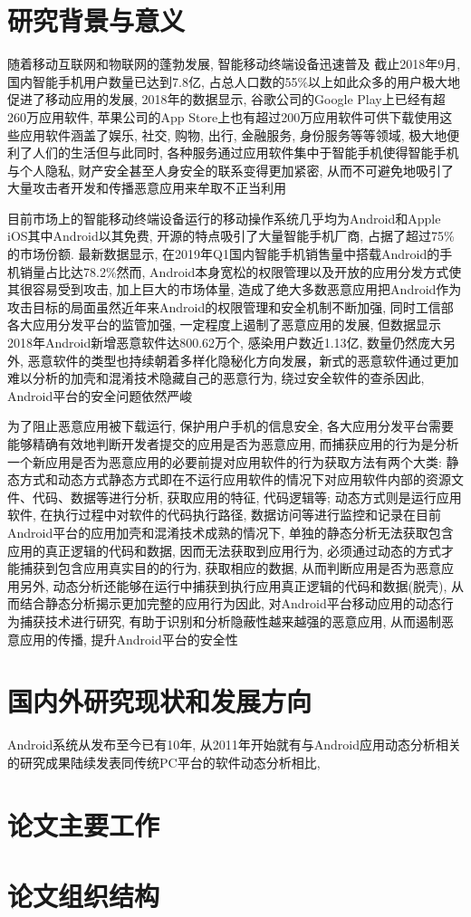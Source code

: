 \section{研究背景与意义}
随着移动互联网和物联网的蓬勃发展, 智能移动终端设备迅速普及\juhao 
截止2018年9月,国内智能手机用户数量已达到7.8亿, 占总人口数的55\%以上\juhao 如此众多的用户极大地促进了移动应用的发展, 2018年的数据显示, 谷歌公司的Google Play上已经有超260万应用软件, 苹果公司的App Store上也有超过200万应用软件可供下载使用\juhao 这些应用软件涵盖了娱乐, 社交, 购物, 出行, 金融服务, 身份服务等等领域, 极大地便利了人们的生活\juhao 但与此同时, 各种服务通过应用软件集中于智能手机使得智能手机与个人隐私, 财产安全甚至人身安全的联系变得更加紧密, 从而不可避免地吸引了大量攻击者开发和传播恶意应用来牟取不正当利用\juhao 

目前市场上的智能移动终端设备运行的移动操作系统几乎均为Android和Apple iOS\juhao 其中Android以其免费, 开源的特点吸引了大量智能手机厂商, 占据了超过75\%的市场份额. 最新数据显示, 在2019年Q1国内智能手机销售量中搭载Android的手机销量占比达78.2\%\juhao 然而, Android本身宽松的权限管理以及开放的应用分发方式使其很容易受到攻击, 加上巨大的市场体量, 造成了绝大多数恶意应用把Android作为攻击目标的局面\juhao 虽然近年来Android的权限管理和安全机制不断加强, 同时工信部各大应用分发平台的监管加强, 一定程度上遏制了恶意应用的发展, 但数据显示2018年Android新增恶意软件达800.62万个, 感染用户数近1.13亿, 数量仍然庞大\juhao 另外, 恶意软件的类型也持续朝着多样化隐秘化方向发展，新式的恶意软件通过更加难以分析的加壳和混淆技术隐藏自己的恶意行为, 绕过安全软件的查杀\juhao 因此, Android平台的安全问题依然严峻\juhao 

为了阻止恶意应用被下载运行, 保护用户手机的信息安全, 各大应用分发平台需要能够精确有效地判断开发者提交的应用是否为恶意应用, 而捕获应用的行为是分析一个新应用是否为恶意应用的必要前提\juhao 对应用软件的行为获取方法有两个大类: 静态方式和动态方式\juhao 静态方式即在不运行应用软件的情况下对应用软件内部的资源文件、代码、数据等进行分析, 获取应用的特征, 代码逻辑等; 动态方式则是运行应用软件, 在执行过程中对软件的代码执行路径, 数据访问等进行监控和记录\juhao 在目前Android平台的应用加壳和混淆技术成熟的情况下, 单独的静态分析无法获取包含应用的真正逻辑的代码和数据, 因而无法获取到应用行为, 必须通过动态的方式才能捕获到包含应用真实目的的行为, 获取相应的数据, 从而判断应用是否为恶意应用\juhao 另外, 动态分析还能够在运行中捕获到执行应用真正逻辑的代码和数据(脱壳), 从而结合静态分析揭示更加完整的应用行为\juhao 因此, 对Android平台移动应用的动态行为捕获技术进行研究, 有助于识别和分析隐蔽性越来越强的恶意应用, 从而遏制恶意应用的传播, 提升Android平台的安全性\juhao

\section{国内外研究现状和发展方向}
Android系统从发布至今已有10年, 从2011年开始就有与Android应用动态分析相关的研究成果陆续发表\juhao 同传统PC平台的软件动态分析相比,  

\section{论文主要工作}

\section{论文组织结构}

 